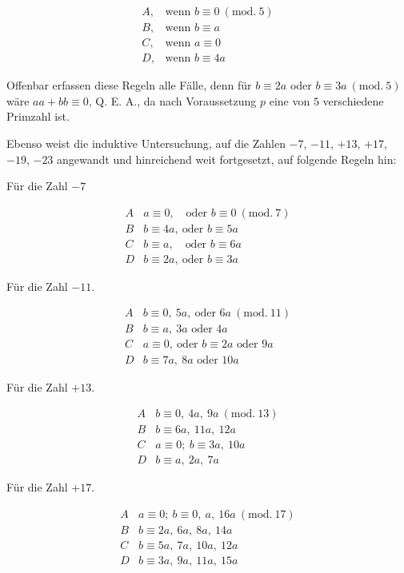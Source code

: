 %
\[
\begin{array}{ll}
A,&\text{wenn }b\equiv0\ (\mathrm{mod.}\ 5)\\
B,&\text{wenn }b\equiv a\\
C,&\text{wenn }a\equiv0\\
D,&\text{wenn }b\equiv4a
\end{array}
\]

Offenbar erfassen diese Regeln alle Fälle, denn für $b\equiv2a$ oder $b\equiv3a\ (\mathrm{mod.}\ 5)$ wäre $aa+bb\equiv0$, Q. E. A., da nach Voraussetzung $p$ eine von $5$ verschiedene Primzahl ist.

Ebenso weist die induktive Untersuchung, auf die Zahlen $-7$, $-11$, $+13$, $+17$, $-19$, $-23$ angewandt und hinreichend weit fortgesetzt, auf folgende Regeln hin:
\begin{center}Für die Zahl $-7$\end{center}
\[
\begin{array}{c|l}
A&a\equiv0,\quad\text{oder }b\equiv0\ (\mathrm{mod.}\ 7)\\
B&b\equiv4a,\ \text{oder }b\equiv5a\\
C&b\equiv a,\quad\text{oder }b\equiv6a\\
D&b\equiv2a,\ \text{oder }b\equiv3a
\end{array}
\]

\begin{center}Für die Zahl $-11$.\end{center}
\[
\begin{array}{c|l}
A&b\equiv0,\ 5a,\ \text{oder }6a\ (\mathrm{mod.}\ 11)\\
B&b\equiv a,\ 3a\text{ oder }4a\\
C&a\equiv0,\ \text{oder }b\equiv2a\text{ oder }9a\\
D&b\equiv7a,\ 8a\text{ oder }10a
\end{array}
\]

\begin{center}Für die Zahl $+13$.\end{center}
\[
\begin{array}{c|l}
A&b\equiv0,\ 4a,\ 9a\ (\mathrm{mod.}\ 13)\\
B&b\equiv6a,\ 11a,\ 12a\\
C&a\equiv0;\ b\equiv3a,\ 10a\\
D&b\equiv a,\ 2a,\ 7a
\end{array}
\]

\begin{center}Für die Zahl $+17$.\end{center}
\[
\begin{array}{c|l}
A&a\equiv0;\ b\equiv0,\ a,\ 16a\ (\mathrm{mod.}\ 17)\\
B&b\equiv2a,\ 6a,\ 8a,\ 14a\\
C&b\equiv5a,\ 7a,\ 10a,\ 12a\\
D&b\equiv3a,\ 9a,\ 11a,\ 15a
\end{array}
\]

